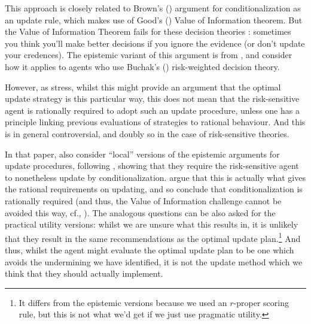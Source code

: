 \documentclass[a4paper]{article}
\newenvironment{CCM rewritten}
{\begingroup\color{blue}} %
{\endgroup}              %
\begin{document}
This approach is closely related to Brown's (\citeyear{brown1976ceu}) argument for conditionalization as an update rule, which makes use of Good's (\citeyear{good1967pte}) Value of Information theorem. But the Value of Information Theorem fails for these decision theories \citep{wakker1988neuai,buchak2010irereg}: sometimes you think you'll make better decisions if you ignore the evidence (or don't update your credences). 
The epistemic variant of this argument is from \citet{greaves2006jcc}, and \citet{campbellmoore2022aurs} consider how it applies to agents who use Buchak's (\citeyear{buchak2014rr}) risk-weighted decision theory. 

However, as \citet{campbellmoore2022aurs} stress, whilst this might provide an argument that the optimal update strategy is this particular way, this does not mean that the risk-sensitive agent is rationally required to adopt such an update procedure, unless one has a principle linking previous evaluations of strategies to rational behaviour. And this is in general controversial, and doubly so in the case of risk-sensitive theories.

In that paper, \citet{campbellmoore2022aurs} also consider ``local'' versions of the epistemic arguments for update procedures, following \citet{leitgeb2010ojb2}, showing that they require the risk-sensitive agent to nonetheless update by conditionalization.  argue that this is actually what gives the rational requirements on updating, and so conclude that conditionalization is rationally required (and thus, the Value of Information challenge cannot be avoided this way, cf., \citep{campbellmoore2020arae}). The analogous questions can be also asked for the practical utility versions: whilst we are unsure what this results in, it is unlikely that they result in the same recommendations as the optimal update plan.\footnote{It differs from the epistemic versions because we used an $r$-proper scoring rule, but this is not what we'd get if we just use pragmatic utility. } And thus, whilst the agent might evaluate the optimal update plan to be one which avoids the undermining we have identified, it is not the update method which we think that they should actually implement. 
\end{document}
